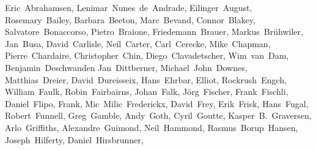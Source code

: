 {\flushleft\small
Eric~Abrahamsen,        %
Lenimar~Nunes~de~Andrade, %
Eilinger~August,        %
Rosemary~Bailey,        %
Barbara~Beeton,         %
Marc~Bevand,            %
Connor~Blakey,          %
Salvatore~Bonaccorso,   %
Pietro~Braione,         %
Friedemann~Brauer,      %
Markus~Br\"uhwiler,     %
Jan~Busa,               %
David~Carlisle,         %
Neil~Carter,            %
Carl~Cerecke,           %
Mike~Chapman,           %
Pierre~Chardaire,       %
Christopher~Chin,       %
Diego~Clavadetscher,    %
Wim~van~Dam,            %
Benjamin~Deschwanden    %
Jan~Dittberner,         %
Michael~John~Downes,    %
Matthias~Dreier,        %
David~Dureisseix,       %
Hans~Ehrbar,            %
Elliot,                 %
Rockrush~Engch,         %
William~Faulk,          %
Robin~Fairbairns,       %
Johan~Falk,             %
J\"org~Fischer,         %
Frank~Fischli,          %
Daniel~Flipo,           %
Frank,                  %
Mic~Milic~Frederickx,   %
David~Frey,             %
Erik~Frisk,             %
Hans~Fugal,             %
Robert~Funnell,         %
Greg~Gamble,            %
Andy~Goth,              %
Cyril~Goutte,           %
Kasper~B.~Graversen,    %
Arlo~Griffiths,         %
Alexandre~Guimond,      %
Neil~Hammond,           %
Rasmus~Borup~Hansen,    %
Joseph~Hilferty,        %
Daniel~Hirsbrunner,     %
}
